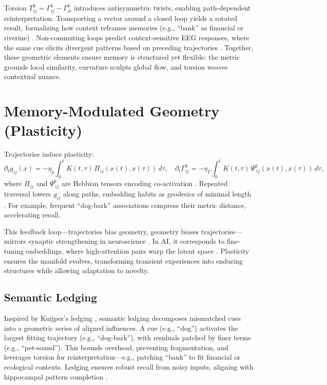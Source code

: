 \documentclass[a4paper,12pt]{article}
\begin{document}
Torsion $T^k_{ij} = \Gamma^k_{ij} - \Gamma^k_{ji}$ introduces antisymmetric twists, enabling path-dependent reinterpretation. Transporting a vector around a closed loop yields a rotated result, formalizing how context reframes memories (e.g., ``bank'' as financial or riverine) \citep{amari1977dynamics}. Non-commuting loops predict context-sensitive EEG responses, where the same cue elicits divergent patterns based on preceding trajectories \citep{stickgold2005sleep}. Together, these geometric elements ensure memory is structured yet flexible: the metric grounds local similarity, curvature sculpts global flow, and torsion weaves contextual nuance.

\section{Memory-Modulated Geometry (Plasticity)}
Trajectories induce plasticity:
\[
\partial_t g_{ij}(x) = -\eta_g \int_0^t K(t,\tau) \, \Pi_{ij}(x(t), x(\tau)) \, d\tau, \quad \partial_t \Gamma^k_{ij} = -\eta_\Gamma \int_0^t K(t,\tau) \, \Psi^k_{\ ij}(x(t), x(\tau)) \, d\tau,
\]
where $\Pi_{ij}$ and $\Psi^k_{\ ij}$ are Hebbian tensors encoding co-activation \citep{hebb1949organization}. Repeated traversal lowers $g_{ij}$ along paths, embedding habits as geodesics of minimal length \citep{sutton2018reinforcement}. For example, frequent ``dog-bark'' associations compress their metric distance, accelerating recall.

This feedback loop—trajectories bias geometry, geometry biases trajectories—mirrors synaptic strengthening in neuroscience \citep{mcclelland1995why}. In AI, it corresponds to fine-tuning embeddings, where high-attention pairs warp the latent space \citep{vaswani2017attention}. Plasticity ensures the manifold evolves, transforming transient experiences into enduring structures while allowing adaptation to novelty.

\subsection{Semantic Ledging}
Inspired by Kuijper’s ledging \citep{kuijper2021geometric}, semantic ledging decomposes mismatched cues into a geometric series of aligned influences. A cue (e.g., ``dog'') activates the largest fitting trajectory (e.g., ``dog-bark''), with residuals patched by finer terms (e.g., ``pet-sound''). This bounds overhead, preventing fragmentation, and leverages torsion for reinterpretation—e.g., patching ``bank'' to fit financial or ecological contexts. Ledging ensures robust recall from noisy inputs, aligning with hippocampal pattern completion \citep{oliver2017hippocampal}.
\end{document}
